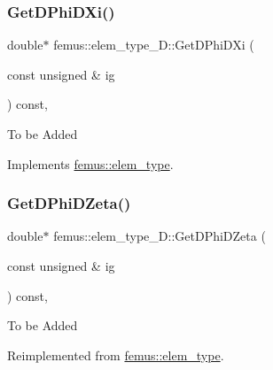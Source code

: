 \subsubsection{\texorpdfstring{Get\+D\+Phi\+D\+Xi()}{GetDPhiDXi()}}
{\footnotesize\ttfamily double$\ast$ femus\+::elem\+\_\+type\+\_\+D\+::\+Get\+D\+Phi\+D\+Xi (\begin{DoxyParamCaption}\item[{const unsigned \&}]{ig }\end{DoxyParamCaption}) const\hspace{0.3cm}{\ttfamily [inline]}, {\ttfamily [virtual]}}

To be Added 

Implements \mbox{\hyperlink{classfemus_1_1elem__type_a6efb6026b9fe89912ec367b235bfccc7}{femus\+::elem\+\_\+type}}.

\mbox{\label{classfemus_1_1elem__type__3_d_a8bf7020e0c07cf44c9532f9b6bab4bbc}} 
\subsubsection{\texorpdfstring{Get\+D\+Phi\+D\+Zeta()}{GetDPhiDZeta()}}
{\footnotesize\ttfamily double$\ast$ femus\+::elem\+\_\+type\+\_\+D\+::\+Get\+D\+Phi\+D\+Zeta (\begin{DoxyParamCaption}\item[{const unsigned \&}]{ig }\end{DoxyParamCaption}) const\hspace{0.3cm}{\ttfamily [inline]}, {\ttfamily [virtual]}}

To be Added 

Reimplemented from \mbox{\hyperlink{classfemus_1_1elem__type_aa507628a4383a9687c8fdefe30d0214a}{femus\+::elem\+\_\+type}}.

\mbox{\label{classfemus_1_1elem__type__3_d_ada0cc038990bffab6a4bc3d1d23f057f}} 
